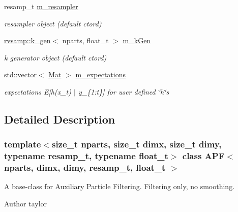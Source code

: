 \begin{DoxyCompactItemize}
\mbox{\label{classAPF_aa4a7b57b66ab249a44d14ea62cb505e3}} 
resamp\+\_\+t \hyperlink{classAPF_aa4a7b57b66ab249a44d14ea62cb505e3}{m\+\_\+resampler}
\begin{DoxyCompactList}\small\item\em resampler object (default ctor\textquotesingle{}d) \end{DoxyCompactList}\item 
\mbox{\label{classAPF_a3288299e2f89fafd6b3dae4fbb31a887}} 
\hyperlink{classrvsamp_1_1k__gen}{rvsamp\+::k\+\_\+gen}$<$ nparts, float\+\_\+t $>$ \hyperlink{classAPF_a3288299e2f89fafd6b3dae4fbb31a887}{m\+\_\+k\+Gen}
\begin{DoxyCompactList}\small\item\em k generator object (default ctor\textquotesingle{}d) \end{DoxyCompactList}\item 
\mbox{\label{classAPF_acd6946024490dc609f39fe4f183513df}} 
std\+::vector$<$ \hyperlink{classAPF_a448066ff44c8afb24c89bcea11d604c6}{Mat} $>$ \hyperlink{classAPF_acd6946024490dc609f39fe4f183513df}{m\+\_\+expectations}
\begin{DoxyCompactList}\small\item\em expectations E\mbox{[}h(x\+\_\+t) $\vert$ y\+\_\+\{1\+:t\}\mbox{]} for user defined \char`\"{}h\char`\"{}s \end{DoxyCompactList}\end{DoxyCompactItemize}


\subsection{Detailed Description}
\subsubsection*{template$<$size\+\_\+t nparts, size\+\_\+t dimx, size\+\_\+t dimy, typename resamp\+\_\+t, typename float\+\_\+t$>$\newline
class A\+P\+F$<$ nparts, dimx, dimy, resamp\+\_\+t, float\+\_\+t $>$}

A base-\/class for Auxiliary Particle Filtering. Filtering only, no smoothing. 

\begin{DoxyAuthor}{Author}
taylor 
\end{DoxyAuthor}


